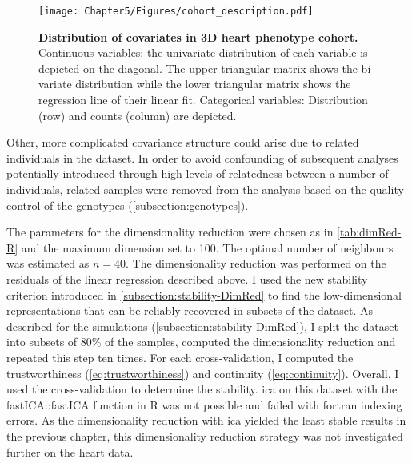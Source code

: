 \begin{figure}[hbtp]
	\centering
	\texttt{[image: Chapter5/Figures/cohort\_description.pdf]}
	\caption[\textbf{Distribution of covariates in 3D heart phenotype cohort.}]{\textbf{Distribution of covariates in 3D heart phenotype cohort. } Continuous variables: the univariate-distribution of each variable is depicted on the diagonal. The upper triangular matrix shows the bi-variate distribution while the lower triangular matrix shows the regression line of their linear fit. Categorical variables: Distribution (row) and counts (column) are depicted.   }
 	\label{fig:cohort}
\end{figure}

Other, more complicated covariance structure could arise due to related individuals in the dataset. In order to avoid confounding of subsequent analyses potentially introduced through high levels of relatedness between a number of individuals, related samples were removed from the analysis based on the quality control of the genotypes (\cref{subsection:genotypes}). 

The parameters for the dimensionality reduction were chosen as in \cref{tab:dimRed-R} and the maximum dimension set to \num{100}. The optimal number of neighbours was estimated as \(n=40\).  The dimensionality reduction was performed on the residuals of the linear regression described above. I used the new stability criterion introduced in \cref{subsection:stability-DimRed} to find the low-dimensional representations that can be reliably recovered in subsets of the dataset. 
As described for the simulations (\cref{subsection:stability-DimRed}), I split the dataset into subsets of \num{80}\% of the samples, computed the dimensionality reduction and repeated this step ten times. For each cross-validation, I computed the trustworthiness (\cref{eq:trustworthiness}) and continuity (\cref{eq:continuity}). Overall, I used the cross-validation to determine the stability. \gls{ica} on this dataset with the fastICA::fastICA function in R was not possible and failed with fortran indexing errors. As the dimensionality reduction with \gls{ica} yielded the least stable results in the previous chapter, this dimensionality reduction strategy was not investigated further on the heart data.  

